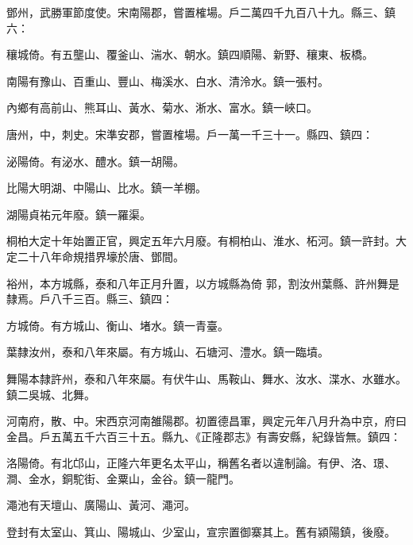 \begin{pinyinscope}
 鄧州，武勝軍節度使。宋南陽郡，嘗置榷場。戶二萬四千九百八十九。縣三、鎮六：



 穰城倚。有五壟山、覆釜山、湍水、朝水。鎮四順陽、新野、穰東、板橋。



 南陽有豫山、百重山、豐山、梅溪水、白水、清泠水。鎮一張村。



 內鄉有高前山、熊耳山、黃水、菊水、淅水、富水。鎮一峽口。



 唐州，中，刺史。宋準安郡，嘗置榷場。戶一萬一千三十一。縣四、鎮四：



 泌陽倚。有泌水、醴水。鎮一胡陽。



 比陽大明湖、中陽山、比水。鎮一羊棚。



 湖陽貞祐元年廢。鎮一羅渠。



 桐柏大定十年始置正官，興定五年六月廢。有桐柏山、淮水、柘河。鎮一許封。大定二十八年命規措界壕於唐、鄧間。



 裕州，本方城縣，泰和八年正月升置，以方城縣為倚
 郭，割汝州葉縣、許州舞是隸焉。戶八千三百。縣三、鎮四：



 方城倚。有方城山、衡山、堵水。鎮一青臺。



 葉隸汝州，泰和八年來屬。有方城山、石塘河、澧水。鎮一臨墳。



 舞陽本隸許州，泰和八年來屬。有伏牛山、馬鞍山、舞水、汝水、渫水、水雖水。鎮二吳城、北舞。



 河南府，散、中。宋西京河南雒陽郡。初置德昌軍，興定元年八月升為中京，府曰金昌。戶五萬五千六百三十五。縣九、《正隆郡志》有壽安縣，紀錄皆無。鎮四：



 洛陽倚。有北邙山，正隆六年更名太平山，稱舊名者以違制論。有伊、洛、璟、澗、金水，銅駝街、金粟山，金谷。鎮一龍門。



 澠池有天壇山、廣陽山、黃河、澠河。



 登封有太室山、箕山、陽城山、少室山，宣宗置御寨其上。舊有潁陽鎮，後廢。




\end{pinyinscope}

